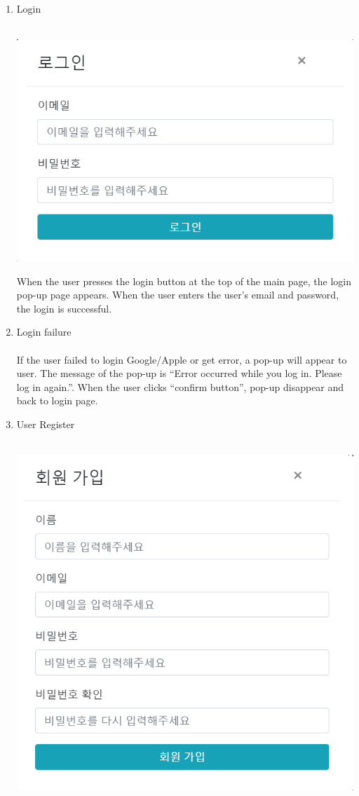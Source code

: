 \documentclass[conference]{IEEEtran}
\begin{document}
\begin{enumerate}
\item{Login}
\\\\\centerline{\includegraphics[scale=0.6]{pics/login.png}}
When the user presses the login button at the top of the main page, the login pop-up page appears. When the user enters the user's email and password, the login is successful.\\
\item{Login failure}\\
\\If the user failed to login Google/Apple or get error, a pop-up will appear to user. The message of the pop-up is “Error occurred while you log in. Please log in again.”. When the user clicks “confirm button”, pop-up disappear and back to login page.\\
\item{User Register}\\
\\\centerline{\includegraphics[scale=0.6]{pics/register.png}}\\

\end{enumerate}
\end{document}
